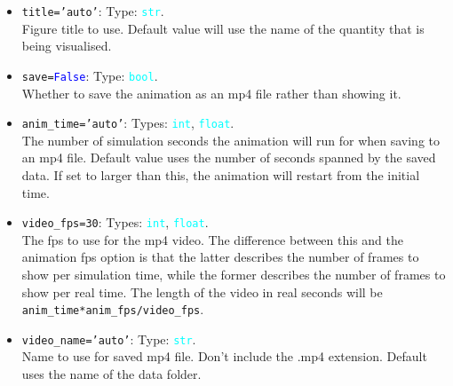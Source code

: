 \documentclass{article}
\newcommand{\ttt}[1]{\texttt{#1}}
\newcommand{\ptype}[1]{\texttt{\textcolor{cyan}{#1}}}
\newcommand{\cbl}[1]{\textcolor{blue}{#1}}
\newcommand{\cro}[1]{\textcolor{RedOrange}{#1}}
\newcommand{\cyo}[1]{\textcolor{YellowOrange}{#1}}
\begin{document}
\begin{itemize}
	\item \ttt{\cro{title}=\cyo{'auto'}}: Type: \ptype{str}.\\Figure title to use. Default value will use the name of the quantity that is being visualised.
	\item \ttt{\cro{save}=\cbl{False}}: Type: \ptype{bool}.\\Whether to save the animation as an mp4 file rather than showing it.
	\item \ttt{\cro{anim\_time}=\cyo{'auto'}}: Types: \ptype{int}, \ptype{float}.\\The number of simulation seconds the animation will run for when saving to an mp4 file. Default value uses the number of seconds spanned by the saved data. If set to larger than this, the animation will restart from the initial time.
	\item \ttt{\cro{video\_fps}=30}: Types: \ptype{int}, \ptype{float}.\\The fps to use for the mp4 video. The difference between this and the animation fps option is that the latter describes the number of frames to show per simulation time, while the former describes the number of frames to show per real time. The length of the video in real seconds will be \ttt{anim\_time*anim\_fps/video\_fps}.
	\item \ttt{\cro{video\_name}=\cyo{'auto'}}: Type: \ptype{str}.\\Name to use for saved mp4 file. Don't include the .mp4 extension. Default uses the name of the data folder.
\end{itemize}
\end{document}
